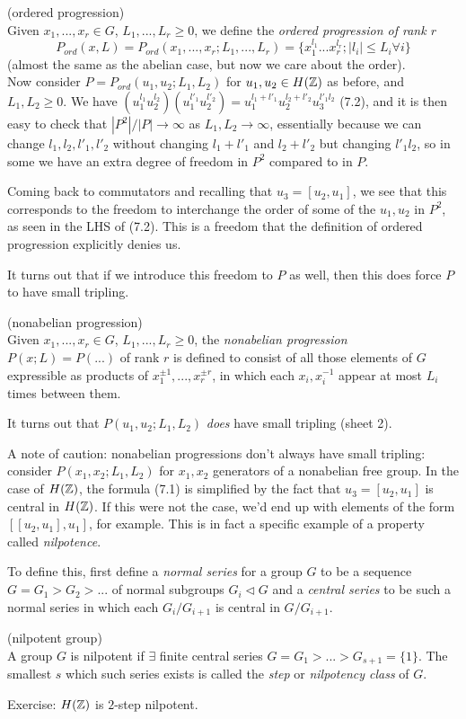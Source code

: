 \documentclass[a4paper]{article}
\begin{document}
\begin{defi} (ordered progression)\\
Given $x_1,...,x_r \in G$, $L_1,...,L_r \geq 0$, we define the \emph{ordered progression of rank $r$} 
\[
P_{ord} (x,L) = P_{ord}(x_1,...,x_r;L_1,...,L_r) = \{x_1^{l_1}...x_r^{l_r}; |l_i| \leq L_i \forall i\}
\]
(almost the same as the abelian case, but now we care about the order).\\
Now consider $P=P_{ord}(u_1,u_2;L_1,L_2)$ for $u_1,u_2 \in H(\mathbb{Z})$ as before, and $L_1,L_2 \geq 0$. We have $(u_1^{l_1} u_2^{l_2}) (u_1^{l'_1}u_2^{l'_2}) = u_1^{l_1+l'_1} u_2^{l_2+l'_2} u_3^{l'_1l_2}$ (7.2), and it is then easy to check that $|P^2|/|P| \to \infty$ as $L_1,L_2 \to \infty$, essentially because we can change $l_1,l_2,l'_1,l'_2$ without changing $l_1+l'_1$ and $l_2+l'_2$ but changing $l'_1l_2$, so in some we have an extra degree of freedom in $P^2$ compared to in $P$.

Coming back to commutators and recalling that $u_3 = [u_2,u_1]$, we see that this corresponds to the freedom to interchange the order of some of the $u_1,u_2$ in $P^2$, as seen in the LHS of (7.2). This is a freedom that the definition of ordered progression explicitly denies us.
\end{defi}

It turns out that if we introduce this freedom to $P$ as well, then this does force $P$ to have small tripling.

\begin{defi} (nonabelian progression)\\
Given $x_1,...,x_r \in G$, $L_1,...,L_r \geq 0$, the \emph{nonabelian progression} $P(x;L) = P(...)$ of rank $r$ is defined to consist of all those elements of $G$ expressible as products of $x_1^{\pm 1},...,x_r^{\pm r}$, in which each $x_i,x_i^{-1}$ appear at most $L_i$ times between them.

It turns out that $P(u_1,u_2;L_1,L_2)$ \emph{does} have small tripling (sheet 2).

A note of caution: nonabelian progressions don't always have small tripling: consider $P(x_1,x_2;L_1,L_2)$ for $x_1,x_2$ generators of a nonabelian free group. In the case of $H(\mathbb{Z})$, the formula (7.1) is simplified by the fact that $u_3=[u_2,u_1]$ is central in $H(\mathbb{Z})$. If this were not the case, we'd end up with elements of the form $[[u_2,u_1],u_1]$, for example. This is in fact a specific example of a property called \emph{nilpotence}.

To define this, first define a \emph{normal series} for a group $G$ to be a sequence $G = G_1 > G_2 > ...$ of normal subgroups $G_i \triangleleft G$ and a \emph{central series} to be such a normal series in which each $G_i/G_{i+1}$ is central in $G/G_{i+1}$.
\end{defi}

\begin{defi} (nilpotent group)\\
A group $G$ is nilpotent if $\exists$ finite central series $G=G_1 >...>G_{s+1} = \{1\}$. The smallest $s$ which such series exists is called the \emph{step} or \emph{nilpotency class} of $G$.
\end{defi}

Exercise: $H(\mathbb{Z})$ is $2$-step nilpotent. 
\end{document}
